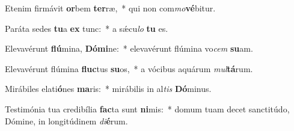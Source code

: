 \item Etenim firmávit \textbf{or}bem \textbf{ter}ræ,~* qui non com\textit{mo}\textbf{vé}bitur.
\item Paráta sedes \textbf{tu}a \textbf{ex} tunc:~* a sǽcu\textit{lo} \textbf{tu} es.
\item Elevavérunt \textbf{flú}mina, \textbf{Dó}\textbf{mi}ne:~* elevavérunt flúmina vo\textit{cem} \textbf{su}am.
\item Elevavérunt flúmina \textbf{fluc}tus \textbf{su}os,~* a vócibus aquárum \textit{mul}\textbf{tá}rum.
\item Mirábiles elati\textbf{ó}nes \textbf{ma}ris:~* mirábilis in al\textit{tis} \textbf{Dó}minus.
\item Testimónia tua credibília \textbf{fac}ta sunt \textbf{ni}mis:~* domum tuam decet sanctitúdo, Dómine, in longitúdinem \textit{di}\textbf{é}rum.
